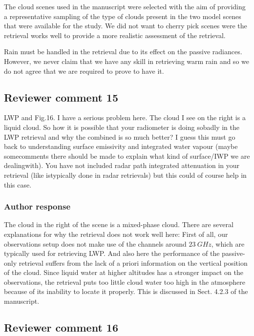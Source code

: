The cloud scenes used in the manuscript were selected with the aim of providing
a representative sampling of the type of clouds present in the two model scenes that
were available for the study. We did not want to cherry pick scenes were the
retrieval works well to provide a more realistic assessment of  the retrieval.

Rain must be handled in the retrieval due to its effect on the passive
radiances. However, we never claim that we have any skill in retrieving warm
rain and so we do not agree that we are required to prove to have it.

\subsection*{Reviewer comment 15}

 LWP and Fig.16. I have a serious problem here. The cloud I see on the right is a
 liquid cloud. So how it is possible that your radiometer is doing sobadly in
 the LWP retrieval and why the combined is so much better? I guess this must go
 back to understanding surface emissivity and integrated water vapour (maybe
 somecomments there should be made to explain what kind of surface/IWP we are
 dealingwith). You have not included radar path integrated attenuation in your
 retrieval (like istypically done in radar retrievals) but this could of course
 help in this case.

\subsubsection*{Author response}

The cloud in the right of the scene is a mixed-phase cloud. There are several
explanations for why the retrieval does not work well here: First of all, our
observations setup does not make use of the channels around $23\ \unit{GHz}$,
which are typically used for retrieving LWP. And also here the performance of
the passive-only retrieval suffers from the lack of a priori information on the
vertical position of the cloud. Since liquid water at higher altitudes has a
stronger impact on the observations, the retrieval puts too little cloud water
too high in the atmosphere because of its inability to locate it properly. This
is discussed in Sect. 4.2.3 of the manuscript.

\subsection*{Reviewer comment 16}


